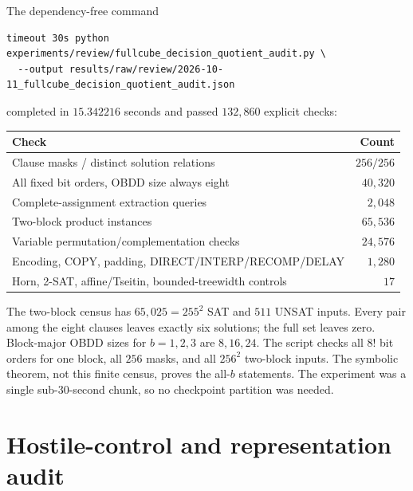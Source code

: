 \documentclass[11pt]{article}
\begin{document}
The dependency-free command
\begin{verbatim}
timeout 30s python experiments/review/fullcube_decision_quotient_audit.py \
  --output results/raw/review/2026-10-11_fullcube_decision_quotient_audit.json
\end{verbatim}
completed in $15.342216$ seconds and passed $132{,}860$ explicit checks:
\begin{center}
\begin{tabular}{lr}
\toprule
Check & Count\\
\midrule
Clause masks / distinct solution relations & $256/256$\\
All fixed bit orders, OBDD size always eight & $40{,}320$\\
Complete-assignment extraction queries & $2{,}048$\\
Two-block product instances & $65{,}536$\\
Variable permutation/complementation checks & $24{,}576$\\
Encoding, COPY, padding, DIRECT/INTERP/RECOMP/DELAY & $1{,}280$\\
Horn, 2-SAT, affine/Tseitin, bounded-treewidth controls & $17$\\
\bottomrule
\end{tabular}
\end{center}
The two-block census has $65{,}025=255^2$ SAT and $511$ UNSAT inputs.
Every pair among the eight clauses leaves exactly six solutions; the full
set leaves zero.  Block-major OBDD sizes for $b=1,2,3$ are $8,16,24$.
The script checks all $8!$ bit orders for one block, all $256$ masks, and all
$256^2$ two-block inputs.  The symbolic theorem, not this finite census,
proves the all-$b$ statements.  The experiment was a single sub-30-second
chunk, so no checkpoint partition was needed.

\section{Hostile-control and representation audit}
\end{document}
